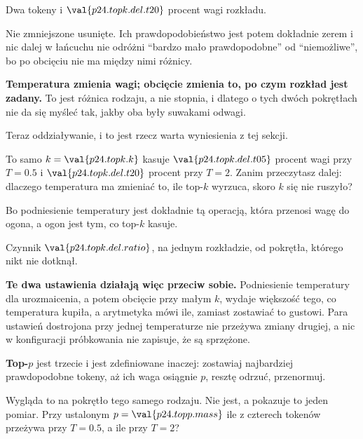 \begin{fr}
\begin{ansblock}
Dwa tokeny i $\val{p24.topk.del.t20}$ procent wagi rozkładu.
\end{ansblock}

Nie zmniejszone \dash{} usunięte. Ich prawdopodobieństwo jest potem dokładnie
zerem i nic dalej w łańcuchu nie odróżni \enquote{bardzo mało prawdopodobne}
od \enquote{niemożliwe}, bo po obcięciu nie ma między nimi różnicy.

\textbf{Temperatura zmienia wagi; obcięcie zmienia to, po czym rozkład jest
zadany.} To jest różnica rodzaju, a nie stopnia, i dlatego o tych dwóch
pokrętłach nie da się myśleć tak, jakby oba były suwakami odwagi.
\end{fr}

\begin{fr}
Teraz oddziaływanie, i to jest rzecz warta wyniesienia z tej sekcji.

To samo $k = \val{p24.topk.k}$ kasuje $\val{p24.topk.del.t05}$ procent wagi
przy $T = \num{0.5}$ i $\val{p24.topk.del.t20}$ procent przy $T = 2$. Zanim
przeczytasz dalej: dlaczego temperatura ma zmieniać to, ile top-$k$
wyrzuca, skoro $k$ się nie ruszyło?
\dotline
\nextframe
\end{fr}

\begin{fr}
\begin{ansblock}
Bo podniesienie temperatury jest dokładnie tą operacją, która przenosi wagę do
ogona, a ogon jest tym, co top-$k$ kasuje.
\end{ansblock}

Czynnik $\val{p24.topk.del.ratio}$, na jednym rozkładzie, od pokrętła, którego
nikt nie dotknął.

\textbf{Te dwa ustawienia działają więc przeciw sobie.} Podniesienie
temperatury dla urozmaicenia, a potem obcięcie przy małym $k$, wydaje większość
tego, co temperatura kupiła, a arytmetyka mówi ile, zamiast zostawiać to
gustowi. Para ustawień dostrojona przy jednej temperaturze nie przeżywa zmiany
drugiej, a nic w konfiguracji próbkowania nie zapisuje, że są sprzężone.
\end{fr}

\begin{fr}
\textbf{Top-$p$} jest trzecie i jest zdefiniowane inaczej: zostawiaj najbardziej
prawdopodobne tokeny, aż ich waga osiągnie $p$, resztę odrzuć, przenormuj.

Wygląda to na pokrętło tego samego rodzaju. Nie jest, a pokazuje to jeden
pomiar. Przy ustalonym $p = \val{p24.topp.mass}$ ile z czterech tokenów
przeżywa przy $T = \num{0.5}$, a ile przy $T = 2$?
\dotline
\nextframe
\end{fr}

